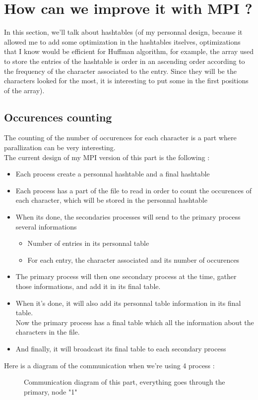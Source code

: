 \section{How can we improve it with MPI ?}
In this section, we'll talk about hashtables (of my personnal design, because it allowed me to add some optimization in the hashtables itselves, optimizations that I know would be efficient for Huffman algorithm, for example, the array used to store the entries of the hashtable is order in an ascending order according to the frequency of the character associated to the entry. Since they will be the characters looked for the most, it is interesting to put some in the first positions of the array).

\subsection{Occurences counting}
The counting of the number of occurences for each character is a part where parallization can be very interesting.\\
The current design of my MPI version of this part is the following :\\
\begin{itemize}
	\item Each process create a personnal hashtable and a final hashtable
	\item Each process has a part of the file to read in order to count the occurences of each character, which will be stored in the personnal hashtable
	\item When its done, the secondaries processes will send to the primary process several informations
	\begin{itemize}
		\item Number of entries in its personnal table
		\item For each entry, the character associated and its number of occurences
	\end{itemize}
	\item The primary process will then one secondary process at the time, gather those informations, and add it in its final table.
	\item When it's done, it will also add its personnal table information in its final table.\\
	Now the primary process has a final table which all the information about the characters in the file.
	\item And finally, it will broadcast its final table to each secondary process
\end{itemize}
Here is a diagram of the communication when we're using 4 process :
\begin{figure}[H]
\centering
{} 
\caption{Communication diagram of this part, everything goes through the primary, node "1"}
\label{fig:my_label}
\end{figure}


